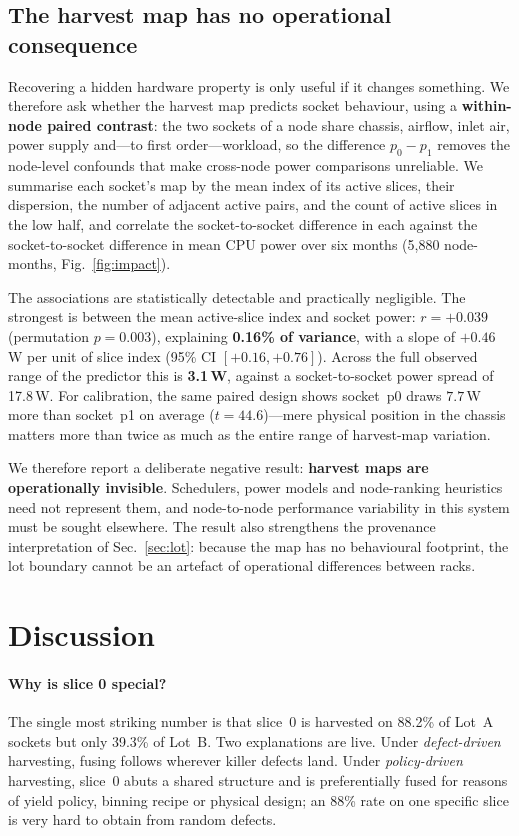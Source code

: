 \documentclass[10pt,conference]{IEEEtran}
\begin{document}
\subsection{The harvest map has no operational consequence}
\label{sec:impact}
Recovering a hidden hardware property is only useful if it changes something. We therefore ask
whether the harvest map predicts socket behaviour, using a \textbf{within-node paired contrast}:
the two sockets of a node share chassis, airflow, inlet air, power supply and---to first
order---workload, so the difference $p_0-p_1$ removes the node-level confounds that make
cross-node power comparisons unreliable. We summarise each socket's map by the mean index of its
active slices, their dispersion, the number of adjacent active pairs, and the count of active
slices in the low half, and correlate the socket-to-socket difference in each against the
socket-to-socket difference in mean CPU power over six months (5{,}880 node-months,
Fig.~\ref{fig:impact}).

The associations are statistically detectable and practically negligible. The strongest is between
the mean active-slice index and socket power: $r=+0.039$ (permutation $p=0.003$), explaining
\textbf{0.16\% of variance}, with a slope of $+0.46$\,W per unit of slice index
(95\% CI $[+0.16,+0.76]$). Across the full observed range of the predictor this is
\textbf{3.1\,W}, against a socket-to-socket power spread of 17.8\,W. For calibration, the same
paired design shows socket~p0 draws $7.7$\,W more than socket~p1 on average ($t=44.6$)---mere
physical position in the chassis matters more than twice as much as the entire range of harvest-map
variation.

We therefore report a deliberate negative result: \textbf{harvest maps are operationally
invisible}. Schedulers, power models and node-ranking heuristics need not represent them, and
node-to-node performance variability in this system must be sought elsewhere. The result also
strengthens the provenance interpretation of Sec.~\ref{sec:lot}: because the map has no
behavioural footprint, the lot boundary cannot be an artefact of operational differences between
racks.

\section{Discussion}
\paragraph{Why is slice 0 special?} The single most striking number is that slice~0 is harvested on
88.2\% of Lot~A sockets but only 39.3\% of Lot~B. Two explanations are live. Under
\emph{defect-driven} harvesting, fusing follows wherever killer defects land. Under
\emph{policy-driven} harvesting, slice~0 abuts a shared structure and is preferentially fused for
reasons of yield policy, binning recipe or physical design; an 88\% rate on one specific slice is
very hard to obtain from random defects.
\end{document}
